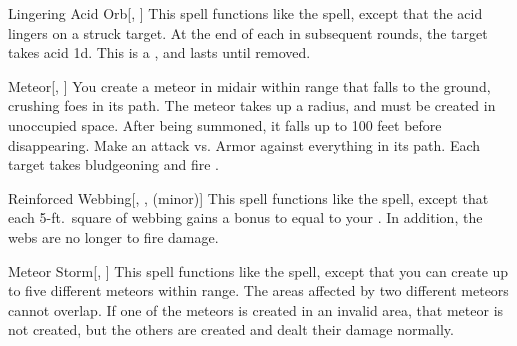 \lowercase{\hypertarget{spell:Lingering Acid Orb}{}}\label{spell:Lingering Acid Orb}
\begin{freeability}[Rank 4]{\hypertarget{spell:Lingering Acid Orb}{Lingering Acid Orb}}[, ]
This spell functions like the  spell, except that the acid lingers on a struck target.
At the end of each  in subsequent rounds, the target takes acid  \minus1d.
This is a , and lasts until removed.
\end{freeability}
\vspace{0.25em}



\lowercase{\hypertarget{spell:Meteor}{}}\label{spell:Meteor}
\begin{freeability}[Rank 4]{\hypertarget{spell:Meteor}{Meteor}}[, ]
You create a meteor in midair within \rngmed range that falls to the ground, crushing foes in its path.
The meteor takes up a \areasmall radius, and must be created in unoccupied space.
After being summoned, it falls up to 100 feet before disappearing.
Make an attack vs. Armor against everything in its path.
\hit Each target takes bludgeoning and fire .
\end{freeability}
\vspace{0.25em}



\lowercase{\hypertarget{spell:Reinforced Webbing}{}}\label{spell:Reinforced Webbing}
\begin{freeability}[Rank 4]{\hypertarget{spell:Reinforced Webbing}{Reinforced Webbing}}[, ,  (minor)]
This spell functions like the  spell, except that each 5-ft.\ square of webbing gains a bonus to  equal to your .
In addition, the webs are no longer  to fire damage.
\end{freeability}
\vspace{0.25em}



\lowercase{\hypertarget{spell:Meteor Storm}{}}\label{spell:Meteor Storm}
\begin{freeability}[Rank 7]{\hypertarget{spell:Meteor Storm}{Meteor Storm}}[, ]
This spell functions like the  spell, except that you can create up to five different meteors within \rnglong range.
The areas affected by two different meteors cannot overlap.
If one of the meteors is created in an invalid area, that meteor is not created, but the others are created and dealt their damage normally.
\end{freeability}
\vspace{0.25em}



